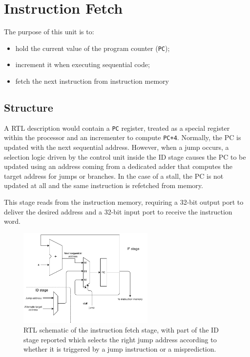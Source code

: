 \section{Instruction Fetch}
The purpose of this unit is to:
\begin{itemize}
	\item hold the current value of the program counter (\texttt{PC}); 
	\item increment it when executing sequential code;
	\item fetch the next instruction from instruction memory
\end{itemize}

\subsection{Structure} A RTL description would contain a \texttt{PC} register, treated as a special register within the processor and an incrementer to compute \texttt{PC+4}. Normally, the PC is updated with the next sequential address. However, when a jump occurs, a selection logic driven by the control unit inside the ID stage causes the PC to be updated using an address coming from a dedicated adder that computes the target address for jumps or branches. In the case of a stall, the PC is not updated at all and the same instruction is refetched from memory.

This stage reads from the instruction memory, requiring a 32-bit output port to deliver the desired address and a 32-bit input port to receive the instruction word. 
\begin{figure}
	\centering
	\includegraphics[width=0.6\textwidth]{../images/IF.pdf}
	\caption{RTL schematic of the instruction fetch stage, with part of the ID stage reported which selects the right jump address according to whether it is triggered by a jump instruction or a misprediction.}
\end{figure}